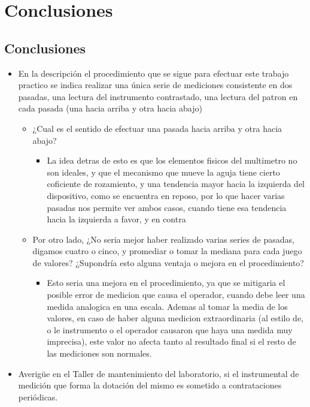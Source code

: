 \chapter{Conclusiones}
\section{Conclusiones}
\begin{itemize}
  \item En la descripción el procedimiento que se sigue para efectuar este trabajo practico se indica realizar una única serie de mediciones consistente en dos pasadas, una lectura del instrumento contrastado, una lectura del patron en cada pasada (una hacia arriba y otra hacia abajo)
  \begin{itemize}
    \item ¿Cual es el sentido de efectuar una pasada hacia arriba y otra hacia abajo?
    \begin{itemize} 
      \item La idea detras de esto es que los elementos fisicos del multimetro no son ideales, y que el mecanismo que mueve la aguja tiene cierto coficiente de rozamiento, y una tendencia mayor hacia la izquierda del dispositivo, como se encuentra en reposo, por lo que hacer varias pasadas nos permite ver ambos casos, cuando tiene esa tendencia hacia la izquierda a favor, y en contra
    \end{itemize}
    \item Por otro lado, ¿No seria mejor haber realizado varias series de pasadas, digamos cuatro o cinco, y promediar o tomar la mediana para cada juego de valores? ¿Supondría esto alguna ventaja o mejora en el procedimiento?
      \begin{itemize}
        \item Esto seria una mejora en el procedimiento, ya que se mitigaria el posible error de medicion que causa el operador, cuando debe leer una medida analogica en una escala.
          Ademas al tomar la media de  los valores, en caso de haber alguna medicion extraordinaria (al estilo de, o le instrumento o el operador causaron que haya una medida muy imprecisa), este valor no afecta tanto al resultado final si el resto de las mediciones son normales.
      \end{itemize}
  \end{itemize}
  \item Averigüe en el Taller de mantenimiento del laboratorio, si el instrumental de medición que forma la dotación del mismo es sometido a contrataciones periódicas.

\end{itemize}
